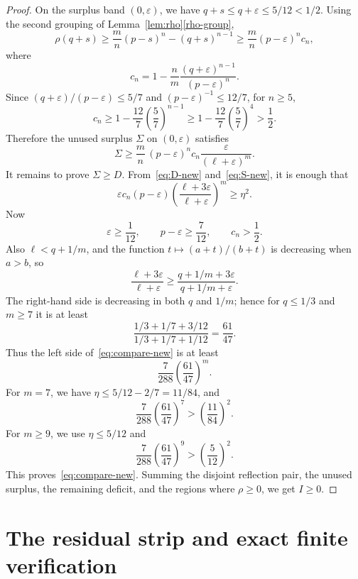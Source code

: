 \documentclass[11pt]{article}
\begin{document}
\begin{proof}
On the surplus band $(0,\varepsilon)$, we have $q+s\le q+\varepsilon\le5/12<1/2$.  Using the second grouping of Lemma~\ref{lem:rho}\ref{rho-group},
\[
        \rho(q+s)
        \ge \frac mn(p-s)^n-(q+s)^{n-1}
        \ge \frac mn(p-\varepsilon)^n c_n,
\]
where
\[
        c_n=1-\frac nm\frac{(q+\varepsilon)^{n-1}}{(p-\varepsilon)^n}.
\]
Since $(q+\varepsilon)/(p-\varepsilon)\le5/7$ and $(p-\varepsilon)^{-1}\le12/7$, for $n\ge5$,
\[
        c_n\ge1-\frac{12}{7}\left(\frac57\right)^{n-1}
        \ge1-\frac{12}{7}\left(\frac57\right)^4>\frac12.
\]
Therefore the unused surplus $\Sigma$ on $(0,\varepsilon)$ satisfies
\begin{equation}\label{eq:S-new}
        \Sigma\ge \frac mn\,(p-\varepsilon)^n c_n
        \frac{\varepsilon}{(\ell+\varepsilon)^m}.
\end{equation}
It remains to prove $\Sigma\ge D$.  From~\eqref{eq:D-new} and~\eqref{eq:S-new}, it is enough that
\begin{equation}\label{eq:compare-new}
        \varepsilon c_n(p-\varepsilon)
        \left(\frac{\ell+3\varepsilon}{\ell+\varepsilon}\right)^m
        \ge\eta^2.
\end{equation}
Now
\[
        \varepsilon\ge\frac1{12},\qquad
        p-\varepsilon\ge\frac7{12},\qquad
        c_n>\frac12.
\]
Also $\ell<q+1/m$, and the function $t\mapsto (a+t)/(b+t)$ is decreasing when $a>b$, so
\[
        \frac{\ell+3\varepsilon}{\ell+\varepsilon}
        \ge
        \frac{q+1/m+3\varepsilon}{q+1/m+\varepsilon}.
\]
The right-hand side is decreasing in both $q$ and $1/m$; hence for $q\le1/3$ and $m\ge7$ it is at least
\[
        \frac{1/3+1/7+3/12}{1/3+1/7+1/12}=\frac{61}{47}.
\]
Thus the left side of~\eqref{eq:compare-new} is at least
\[
        \frac7{288}\left(\frac{61}{47}\right)^m.
\]
For $m=7$, we have $\eta\le 5/12-2/7=11/84$, and
\[
        \frac7{288}\left(\frac{61}{47}\right)^7>\left(\frac{11}{84}\right)^2.
\]
For $m\ge9$, we use $\eta\le5/12$ and
\[
        \frac7{288}\left(\frac{61}{47}\right)^9>
        \left(\frac5{12}\right)^2.
\]
This proves~\eqref{eq:compare-new}.  Summing the disjoint reflection pair, the unused surplus, the remaining deficit, and the regions where $\rho\ge0$, we get $I\ge0$.
\end{proof}

\section{The residual strip and exact finite verification}\label{sec:strip}
\end{document}
